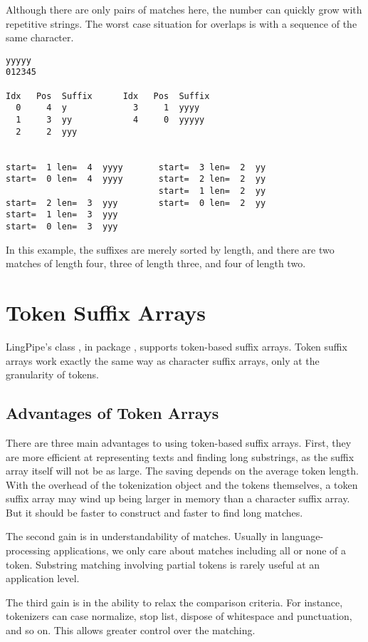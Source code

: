 Although there are only pairs of matches here, the number can
quickly grow with repetitive strings.  The worst case situation for
overlaps is with a sequence of the same character. 
%
\begin{verbatim}
yyyyy
012345

Idx   Pos  Suffix      Idx   Pos  Suffix
  0     4  y             3     1  yyyy
  1     3  yy            4     0  yyyyy
  2     2  yyy


start=  1 len=  4  yyyy       start=  3 len=  2  yy
start=  0 len=  4  yyyy       start=  2 len=  2  yy
                              start=  1 len=  2  yy
start=  2 len=  3  yyy        start=  0 len=  2  yy
start=  1 len=  3  yyy
start=  0 len=  3  yyy
\end{verbatim}
%
In this example, the suffixes are merely sorted by length, and
there are two matches of length four, three of length three, and
four of length two.


\section{Token Suffix Arrays}

LingPipe's class , in package
, supports token-based suffix arrays.  Token suffix
arrays work exactly the same way as character suffix arrays, only at
the granularity of tokens.

\subsection{Advantages of Token Arrays}

There are three main advantages to using token-based suffix arrays.
First, they are more efficient at representing texts and finding
long substrings, as the suffix array itself will not be as large.  The
saving depends on the average token length.  With the overhead of
the tokenization object and the tokens themselves, a token suffix
array may wind up being larger in memory than a character suffix array.
But it should be faster to construct and faster to find long matches.

The second gain is in understandability of matches.  Usually in
language-processing applications, we only care about matches including
all or none of a token.  Substring matching involving partial tokens
is rarely useful at an application level.

The third gain is in the ability to relax the comparison criteria.
For instance, tokenizers can case normalize, stop list, dispose of
whitespace and punctuation, and so on.  This allows greater control
over the matching.

